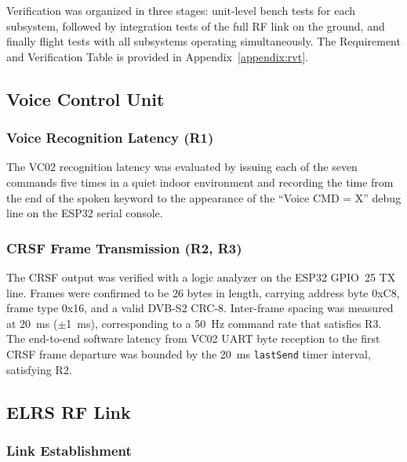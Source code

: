 Verification was organized in three stages: unit-level bench tests for each subsystem, followed
by integration tests of the full RF link on the ground, and finally flight tests with all subsystems
operating simultaneously.
The Requirement and Verification Table is provided in Appendix~\ref{appendix:rvt}.

\subsection{Voice Control Unit}

\subsubsection{Voice Recognition Latency (R1)}


The VC02 recognition latency was evaluated by issuing each of the seven commands five times
in a quiet indoor environment and recording the time from the end of the spoken keyword to the
appearance of the ``Voice CMD = X'' debug line on the ESP32 serial console.

\subsubsection{CRSF Frame Transmission (R2, R3)}

The CRSF output was verified with a logic analyzer on the ESP32 GPIO~25 TX line.
Frames were confirmed to be 26 bytes in length, carrying address byte 0xC8, frame type 0x16,
and a valid DVB-S2 CRC-8.
Inter-frame spacing was measured at 20~ms ($\pm$1~ms), corresponding to a 50~Hz command
rate that satisfies R3.
The end-to-end software latency from VC02 UART byte reception to the first CRSF frame
departure was bounded by the 20~ms \texttt{lastSend} timer interval, satisfying R2.

\subsection{ELRS RF Link}

\subsubsection{Link Establishment}

